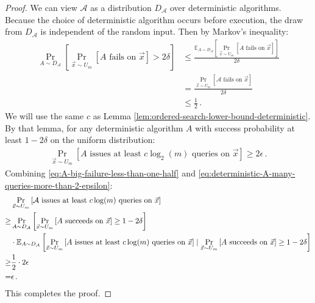 \documentclass[11pt]{article}
\begin{document}
\begin{proof}
\begin{comment}
    More formal writeup of the above approach:
\end{comment}
    We can view $\mathcal{A}$ as a distribution $D_{\mathcal{A}}$ over deterministic algorithms. Because the choice of deterministic algorithm occurs before execution, the draw from $D_{\mathcal{A}}$ is independent of the random input. Then by Markov's inequality:
    \begin{align}
        \Pr_{A \sim D_{\mathcal{A}}} \left[ \Pr_{\vec{x} \sim U_m} \left[ \text{$A$ fails on $\vec{x}$}\right] > 2\delta \right] &\leq \frac{\mathbb{E}_{A \sim D_{\mathcal{A}}} \left[\Pr_{\vec{x} \sim U_m} \left[ \text{$A$ fails on $\vec{x}$}\right]\right]}{2\delta} \\
        &= \frac{\Pr_{\vec{x} \sim U_m} \left[ \text{$\mathcal{A}$ fails on $\vec{x}$}\right]}{2\delta} \\
        &\leq \frac{1}{2}\,. \label{eq:A-big-failure-less-than-one-half}
    \end{align}
    We will use the same $c$ as Lemma \ref{lem:ordered-search-lower-bound-deterministic}. By that lemma, for any deterministic algorithm $A$ with success probability at least $1-2\delta$ on the uniform distribution:
    \begin{align}
        \Pr_{\vec{x} \sim U_m} \left[A \mbox{ issues at least } c \log_2(m) \mbox{ queries on } \vec{x} \right] \geq 2\epsilon\,. \label{eq:deterministic-A-many-queries-more-than-2-epsilon}
    \end{align}
    Combining \eqref{eq:A-big-failure-less-than-one-half} and \eqref{eq:deterministic-A-many-queries-more-than-2-epsilon}:
    \begin{align}
        &\Pr_{\vec{x} \sim U_m} \left[\mathcal{A} \mbox{ issues at least } c \log(m) \mbox{ queries on } \vec{x} \right] \\
        \geq& \Pr_{A \sim D_{\mathcal{A}}} \left[\Pr_{\vec{x} \sim U_m} \left[ \text{$A$ succeeds on $\vec{x}$} \right] \geq 1-2\delta\right] \\
        &\cdot \mathbb{E}_{A \sim D_{\mathcal{A}}}  \left[\Pr_{\vec{x} \sim U_m} \left[A \mbox{ issues at least } c \log(m) \mbox{ queries on } \vec{x} \right] \mid \Pr_{\vec{x} \sim U_m} \left[ \text{$A$ succeeds on $\vec{x}$} \right] \geq 1-2\delta\right] \notag \\
        \geq& \frac{1}{2} \cdot 2\epsilon \\
        =& \epsilon \,.
    \end{align}
    This completes the proof.
\end{proof}
\end{document}
